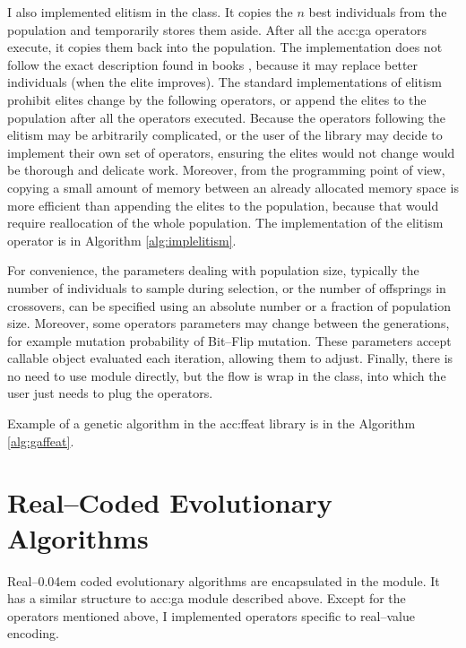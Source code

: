 I also implemented elitism in the  class. It copies the $n$ best individuals from the population and temporarily stores them aside. After all the \acrshort{acc:ga} operators execute, it copies them back into the population. The implementation does not follow the exact description found in books \citep{IntroductionToEA}, because it may replace better individuals (when the elite improves). The standard implementations of elitism prohibit elites change by the following operators, or append the elites to the population after all the operators executed. 
Because the operators following the elitism may be arbitrarily complicated, or the user of the library may decide to implement their own set of operators, ensuring the elites would not change would be thorough and delicate work.
Moreover, from the \gpu programming point of view, copying a small amount of memory between an already allocated memory space is more efficient than appending the elites to the population, because that would require reallocation of the whole population. The implementation of the elitism operator is in Algorithm \ref{alg:implelitism}.

For convenience, the parameters dealing with population size, typically the number of individuals to sample during selection, or the number of offsprings in crossovers, can be specified using an absolute number or a fraction of population size. Moreover, some operators parameters may change between the generations, for example mutation probability of Bit--Flip mutation. These parameters accept callable object evaluated each iteration, allowing them to adjust. Finally, there is no need to use  module directly, but the flow is wrap in the  class, into which the user just needs to plug the operators.

Example of a genetic algorithm in the \acrshort{acc:ffeat} library is in the Algorithm \ref{alg:gaffeat}.



\section{Real--Coded Evolutionary Algorithms}

Real--\kern0.04em coded evolutionary algorithms are encapsulated in the  module. It has a similar structure to \acrshort{acc:ga} module described above. Except for the operators mentioned above, I implemented operators specific to real--value encoding.

